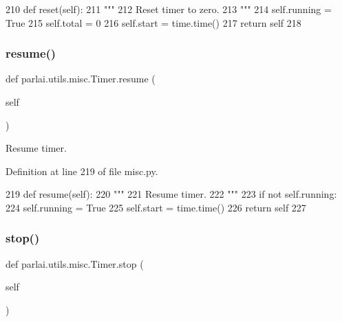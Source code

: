 \begin{DoxyCode}
210     \textcolor{keyword}{def }reset(self):
211         \textcolor{stringliteral}{"""}
212 \textcolor{stringliteral}{        Reset timer to zero.}
213 \textcolor{stringliteral}{        """}
214         self.running = \textcolor{keyword}{True}
215         self.total = 0
216         self.start = time.time()
217         \textcolor{keywordflow}{return} self
218 
\end{DoxyCode}
\mbox{\label{classparlai_1_1utils_1_1misc_1_1Timer_a855f1e8a3ba03fe16712fd7ae49dab46}} 
\subsubsection{\texorpdfstring{resume()}{resume()}}
{\footnotesize\ttfamily def parlai.\+utils.\+misc.\+Timer.\+resume (\begin{DoxyParamCaption}\item[{}]{self }\end{DoxyParamCaption})}

\begin{DoxyVerb}Resume timer.
\end{DoxyVerb}
 

Definition at line 219 of file misc.\+py.


\begin{DoxyCode}
219     \textcolor{keyword}{def }resume(self):
220         \textcolor{stringliteral}{"""}
221 \textcolor{stringliteral}{        Resume timer.}
222 \textcolor{stringliteral}{        """}
223         \textcolor{keywordflow}{if} \textcolor{keywordflow}{not} self.running:
224             self.running = \textcolor{keyword}{True}
225             self.start = time.time()
226         \textcolor{keywordflow}{return} self
227 
\end{DoxyCode}
\mbox{\label{classparlai_1_1utils_1_1misc_1_1Timer_a5a7a90c124ef1b1b92a550606a3c93b9}} 
\subsubsection{\texorpdfstring{stop()}{stop()}}
{\footnotesize\ttfamily def parlai.\+utils.\+misc.\+Timer.\+stop (\begin{DoxyParamCaption}\item[{}]{self }\end{DoxyParamCaption})}

